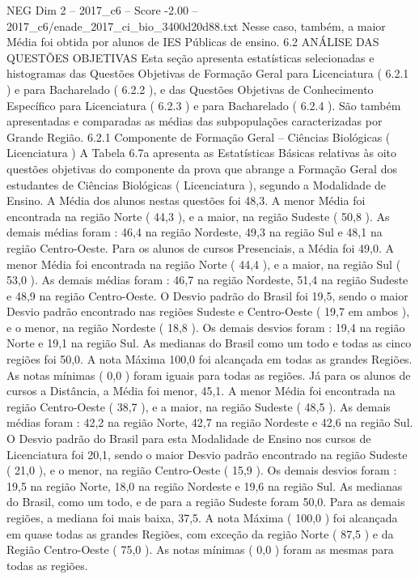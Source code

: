 \begin{textsample}{NEG Dim 2 – 2017\_c6 – Score -2.00 – 2017\_c6/enade\_2017\_ci\_bio\_3400d20d88.txt}
Nesse caso, também, a maior Média foi obtida por alunos de IES Públicas de ensino. 6.2 ANÁLISE DAS QUESTÕES OBJETIVAS Esta seção apresenta estatísticas selecionadas e histogramas das Questões Objetivas de Formação Geral para Licenciatura ( 6.2.1 ) e para Bacharelado ( 6.2.2 ), e das Questões Objetivas de Conhecimento Específico para Licenciatura ( 6.2.3 ) e para Bacharelado ( 6.2.4 ).
São também apresentadas e comparadas as médias das subpopulações caracterizadas por Grande Região. 6.2.1 Componente de Formação Geral – Ciências Biológicas ( Licenciatura ) A Tabela 6.7a apresenta as Estatísticas Básicas relativas às oito questões objetivas do componente da prova que abrange a Formação Geral dos estudantes de Ciências Biológicas ( Licenciatura ), segundo a Modalidade de Ensino.
A Média dos alunos nestas questões foi 48,3.
A menor Média foi encontrada na região Norte ( 44,3 ), e a maior, na região Sudeste ( 50,8 ).
As demais médias foram : 46,4 na região Nordeste, 49,3 na região Sul e 48,1 na região Centro-Oeste.
Para os alunos de cursos Presenciais, a Média foi 49,0.
A menor Média foi encontrada na região Norte ( 44,4 ), e a maior, na região Sul ( 53,0 ).
As demais médias foram : 46,7 na região Nordeste, 51,4 na região Sudeste e 48,9 na região Centro-Oeste.
O Desvio padrão do Brasil foi 19,5, sendo o maior Desvio padrão encontrado nas regiões Sudeste e Centro-Oeste ( 19,7 em ambos ), e o menor, na região Nordeste ( 18,8 ).
Os demais desvios foram : 19,4 na região Norte e 19,1 na região Sul.
As medianas do Brasil como um todo e todas as cinco regiões foi 50,0.
A nota Máxima 100,0 foi alcançada em todas as grandes Regiões.
As notas mínimas ( 0,0 ) foram iguais para todas as regiões.
Já para os alunos de cursos a Distância, a Média foi menor, 45,1.
A menor Média foi encontrada na região Centro-Oeste ( 38,7 ), e a maior, na região Sudeste ( 48,5 ).
As demais médias foram : 42,2 na região Norte, 42,7 na região Nordeste e 42,6 na região Sul.
O Desvio padrão do Brasil para esta Modalidade de Ensino nos cursos de Licenciatura foi 20,1, sendo o maior Desvio padrão encontrado na região Sudeste ( 21,0 ), e o menor, na região Centro-Oeste ( 15,9 ).
Os demais desvios foram : 19,5 na região Norte, 18,0 na região Nordeste e 19,6 na região Sul.
As medianas do Brasil, como um todo, e de para a região Sudeste foram 50,0.
Para as demais regiões, a mediana foi mais baixa, 37,5.
A nota Máxima ( 100,0 ) foi alcançada em quase todas as grandes Regiões, com exceção da região Norte ( 87,5 ) e da Região Centro-Oeste ( 75,0 ).
As notas mínimas ( 0,0 ) foram as mesmas para todas as regiões.

\end{textsample}
